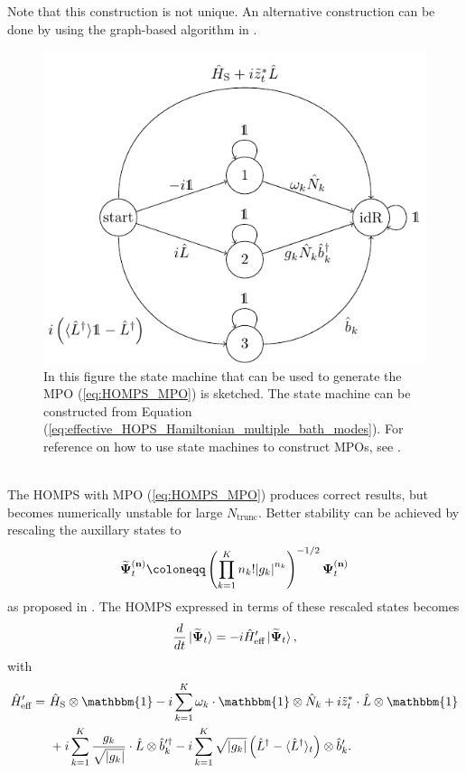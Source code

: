 Note that this construction is not unique. An alternative construction can be done by using the
graph-based algorithm in \cite{Ren:2020}. \\
\begin{figure}
    \centering
    \includegraphics{figures/tikz/state_machine/state_machine.pdf}
    \caption{In this figure the state machine that can be used to generate the MPO (\ref{eq:HOMPS_MPO}) is sketched.
    The state machine can be constructed from Equation (\ref{eq:effective_HOPS_Hamiltonian_multiple_bath_modes}). For
    reference on how to use state machines to construct MPOs, see \cite{Motruk:2016}.}
    \label{fig:state_machine}
\end{figure}
\\
The HOMPS with MPO (\ref{eq:HOMPS_MPO}) produces correct results, but becomes numerically unstable for large $N_\text{trunc}$.
Better stability can be achieved by rescaling the auxillary states to
\begin{equation*}
    \vectorbold{\widetilde{\Psi}}_t^{(\vectorbold{n})} \coloneqq \left(
        \prod_{k=1}^{K} n_k!\abs{g_k}^{n_k}
    \right)^{-1/2} \vectorbold{\Psi}_t^{(\vectorbold{n})}
\end{equation*}
as proposed in \cite{Gao:2022}.
The HOMPS expressed in terms of these rescaled states becomes
\begin{equation*}
    \frac{d}{d t}\ket*{\vb*{\widetilde{\Psi}}_t} = -i\hat{H}_\text{eff}^\prime \ket*{\vb*{\widetilde{\Psi}}_t},
\end{equation*}
with
\begin{equation*}
    \label{eq:effective_HOPS_Hamiltonian_multiple_bath_modes_rescaled}
    \begin{split}
        \hat{H}_\text{eff}^\prime = \,\,&\hat{H}_\text{S} \otimes \mathbbm{1} - i\sum_{k=1}^{K} \omega_k \cdot \mathbbm{1} \otimes \hat{N}_k + i\tilde{z}_t^*\cdot\hat{L} \otimes \mathbbm{1}\\
        &+ i\sum_{k=1}^{K} \frac{g_k}{\sqrt{\abs{g_k}}} \cdot \hat{L} \otimes \hat{b}^{\prime\dagger}_k - i\sum_{k=1}^{K} \sqrt{\abs{g_k}} \left(\hat{L}^\dagger - \langle\hat{L}^\dagger\rangle_t\right) \otimes \hat{b}_k^\prime.
    \end{split}
\end{equation*}
